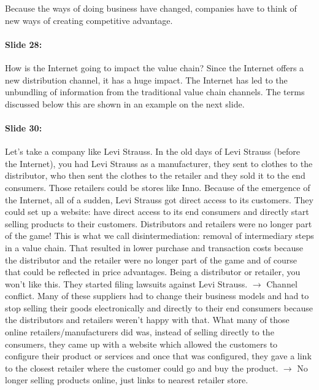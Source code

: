 \documentclass[10pt,a4paper]{report}
\begin{document}
Because the ways of doing business have changed, companies have to think of new ways of creating competitive advantage.

\paragraph{Slide 28:}How is the Internet going to impact the value chain? Since the Internet offers a new distribution channel, it has a huge impact. The Internet has led to the unbundling of information from the traditional value chain channels. The terms discussed below this are shown in an example on the next slide.

\paragraph{Slide 30:}Let's take a company like Levi Strauss. In the old days of Levi Strauss (before the Internet), you had Levi Strauss as a manufacturer, they sent to clothes to the distributor, who then sent the clothes to the retailer and they sold it to the end consumers. Those retailers could be stores like Inno. Because of the emergence of the Internet, all of a sudden, Levi Strauss got direct access to its customers. They could set up a website: have direct access to its end consumers and directly start selling products to their customers. Distributors and retailers were no longer part of the game! This is what we call disintermediation: removal of intermediary steps in a value chain. That resulted in lower purchase and transaction costs because the distributor and the retailer were no longer part of the game and of course that could be reflected in price advantages. Being a distributor or retailer, you won't like this. They started filing lawsuits against Levi Strauss. $\rightarrow$ Channel conflict. Many of these suppliers had to change their business models and had to stop selling their goods electronically and directly to their end consumers because the distributors and retailers weren't happy with that. What many of those online retailers/manufacturers did was, instead of selling directly to the consumers, they came up with a website which allowed the customers to configure their product or services and once that was configured, they gave a link to the closest retailer where the customer could go and buy the product. $\rightarrow$ No longer selling products online, just links to nearest retailer store.
\end{document}
